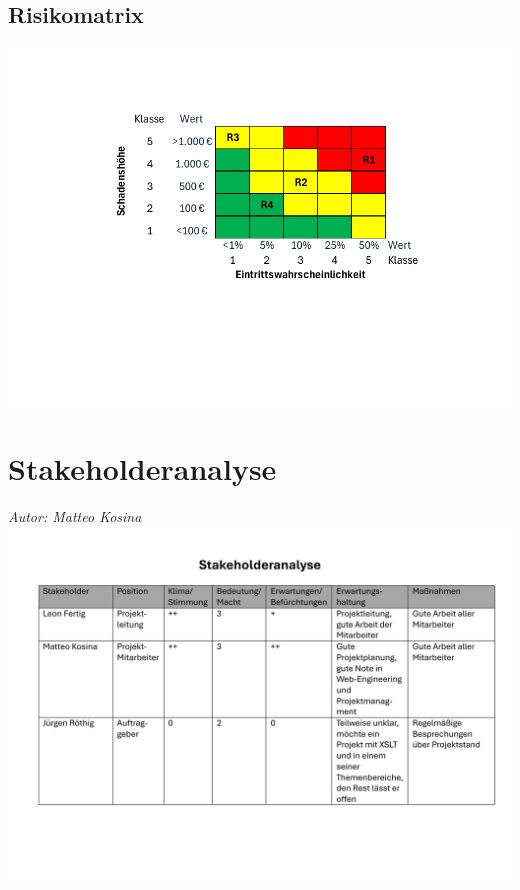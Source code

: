 \documentclass[12pt]{article}
\begin{document}
\subsection*{Risikomatrix}
\includegraphics[width=\textwidth]{Planungsdokumente/graphics/Risikomatrix.pdf}

\section{Stakeholderanalyse}
{\it Autor: Matteo Kosina}
\newline
\includegraphics[width=\textwidth]{Planungsdokumente/graphics/Stakeholderanalyse.pdf}
\end{document}
